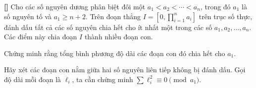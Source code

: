 \documentclass[../03-arithmetic-functions.tex]{subfiles}
\begin{document}
\begin{exercise*}\label{example:GBR-2015-TST-N3-P3}\textbf{[]}
    Cho các số nguyên dương phân biệt đôi một \( a_1 < a_2 < \cdots < a_n \), trong đó \( a_1 \) là số nguyên tố và \( a_1 \geq n + 2 \).
    Trên đoạn thẳng \( I = \left[0, \prod_{i=1}^n a_i \right] \) trên trục số thực, đánh dấu tất cả các số nguyên chia hết cho ít nhất một trong các số \( a_1, a_2, \ldots, a_n \).
    Các điểm này chia đoạn \( I \) thành nhiều đoạn con.

    Chứng minh rằng tổng bình phương độ dài các đoạn con đó chia hết cho \( a_1 \).
\end{exercise*}

\begin{remark*}
    Hãy xét các đoạn con nằm giữa hai số nguyên liên tiếp không bị đánh dấu. Gọi độ dài mỗi đoạn là \( \ell_i \), ta cần chứng minh \( \sum \ell_i^2 \equiv 0 \pmod{a_1} \).
\end{remark*}


\end{document}
